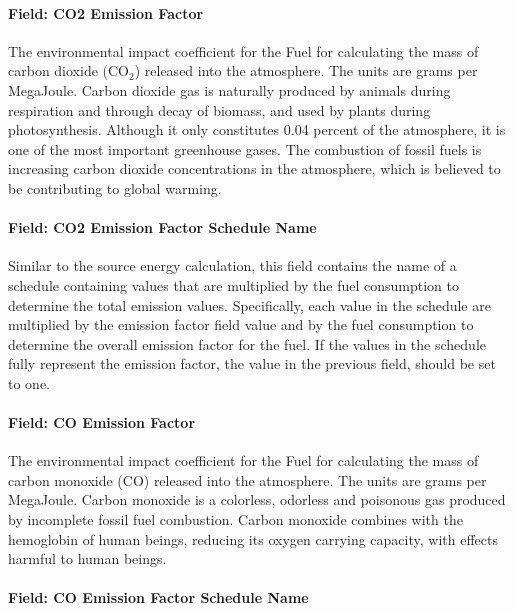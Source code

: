 \paragraph{Field: CO2 Emission Factor}\label{field-co2-emission-factor}

The environmental impact coefficient for the Fuel for calculating the mass of carbon dioxide (CO\(_{2}\)) released into the atmosphere. The units are grams per MegaJoule. Carbon dioxide gas is naturally produced by animals during respiration and through decay of biomass, and used by plants during photosynthesis. Although it only constitutes 0.04 percent of the atmosphere, it is one of the most important greenhouse gases. The combustion of fossil fuels is increasing carbon dioxide concentrations in the atmosphere, which is believed to be contributing to global warming.

\paragraph{Field: CO2 Emission Factor Schedule Name}\label{field-co2-emission-factor-schedule-name}

Similar to the source energy calculation, this field contains the name of a schedule containing values that are multiplied by the fuel consumption to determine the total emission values. Specifically, each value in the schedule are multiplied by the emission factor field value and by the fuel consumption to determine the overall emission factor for the fuel. If the values in the schedule fully represent the emission factor, the value in the previous field, should be set to one.

\paragraph{Field: CO Emission Factor}\label{field-co-emission-factor}

The environmental impact coefficient for the Fuel for calculating the mass of carbon monoxide (CO) released into the atmosphere. The units are grams per MegaJoule. Carbon monoxide is a colorless, odorless and poisonous gas produced by incomplete fossil fuel combustion. Carbon monoxide combines with the hemoglobin of human beings, reducing its oxygen carrying capacity, with effects harmful to human beings.

\paragraph{Field: CO Emission Factor Schedule Name}\label{field-co-emission-factor-schedule-name}

